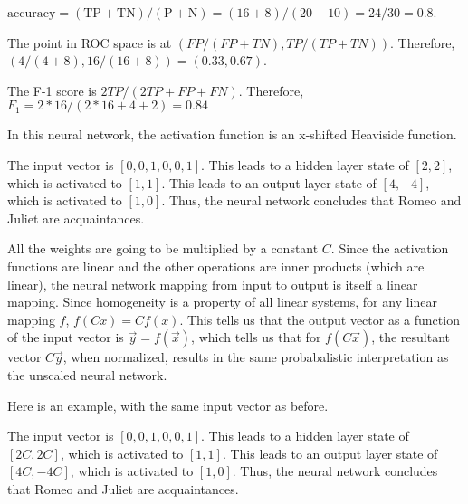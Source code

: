 \documentclass[11pt,largemargins, anonymous]{homework}
\begin{document}
\clearpage
\maketitle
\clearpage

\question

\begin{alphaparts}
    \questionpart
    $ \mathrm{accuracy} = (\mathrm{TP + TN}) / (\mathrm{P + N}) = (16 + 8) / (20 + 10) = 24/30 = 0.8$.

    \questionpart
    The point in ROC space is at $\left ( FP / (FP + TN) , TP / (TP + TN) \right )$.
    Therefore, $ ( 4 / (4 + 8) , 16 / (16 + 8) ) = (0.33, 0.67)$.

    \questionpart
    The F-1 score is $2 TP / (2 TP + FP + FN)$.
    Therefore, $F_1 = 2 * 16 / (2 * 16 + 4 + 2) = 0.84$
\end{alphaparts}

\question
In this neural network, the activation function is an x-shifted Heaviside function.

\begin{alphaparts}
    \questionpart
    The input vector is $[0, 0, 1, 0, 0, 1]$.
    This leads to a hidden layer state of $[2, 2]$, which is activated to
    $[1, 1]$.
    This leads to an output layer state of $[4, -4]$, which is activated to $[1, 0]$.
    Thus, the neural network concludes that Romeo and Juliet are acquaintances.

    \questionpart
    All the weights are going to be multiplied by a constant $C$.
    Since the activation functions are linear and the other operations are inner products
    (which are linear), the neural network mapping from input to output is itself a linear mapping.
    Since homogeneity is a property of all linear systems, for any linear mapping $f$,
    $f(Cx) = C f(x)$.
    This tells us that the output vector as a function of the input vector is $\vec{y} = f(\vec{x})$,
    which tells us that for $f(C \vec{x})$, the resultant vector $C \vec{y}$, when normalized,
    results in the same probabalistic interpretation as the unscaled neural network.

    Here is an example, with the same input vector as before.

    The input vector is $[0, 0, 1, 0, 0, 1]$.
    This leads to a hidden layer state of $[2C, 2C]$, which is activated to
    $[1, 1]$.
    This leads to an output layer state of $[4C, -4C]$, which is activated to $[1, 0]$.
    Thus, the neural network concludes that Romeo and Juliet are acquaintances.

\end{alphaparts}
\end{document}

